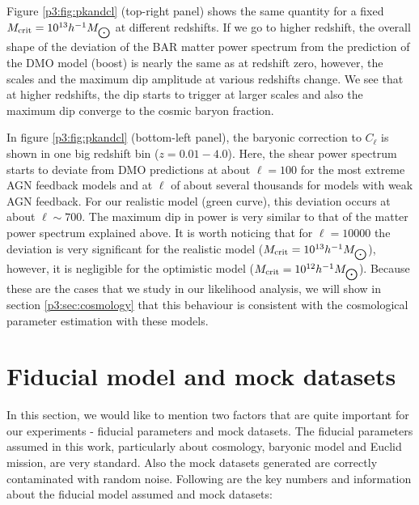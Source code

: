 \documentclass[
  11pt,
  twoside,
  openright,
  titlepage,
  headings=optiontoheadandtoc
]{scrbook}
\begin{document}
Figure \ref{p3:fig:pkandcl} (top-right panel) shows the same quantity for a fixed $M_{\rm crit} = 10^{13} h^{-1} M_{\bigodot}$ at different redshifts. If we go to higher redshift, the overall shape of the deviation of the BAR matter power spectrum from the prediction of the DMO model (boost) is nearly the same as at redshift zero, however, the scales and the maximum dip amplitude at various redshifts change. We see that at higher redshifts, the dip starts to trigger at larger scales and also the maximum dip converge to the cosmic baryon fraction.

In figure \ref{p3:fig:pkandcl} (bottom-left panel), the baryonic correction to $C_{\ell}$ is shown in one big redshift bin ($z=0.01-4.0$). Here, the shear power spectrum starts to deviate from DMO predictions at about $\ell =100$ for the most extreme AGN feedback models and at $\ell$ of about several thousands for models with weak AGN feedback. For our realistic model (green curve), this deviation occurs at about $\ell \sim 700$. The maximum dip in power is very similar to that of the matter power spectrum explained above. It is worth noticing that for $\ell=10000$ the deviation is very significant for the realistic model ($M_{\rm crit} = 10^{13} h^{-1} M_{\bigodot}$), however, it is negligible for the optimistic model ($M_{\rm crit} = 10^{12} h^{-1} M_{\bigodot}$). Because these are the cases that we study in our likelihood analysis, we will show in section \ref{p3:sec:cosmology} that this behaviour is consistent with the cosmological parameter estimation with these models.





\section{Fiducial model and mock datasets}
\label{p3:sec:fiducial}

In this section, we would like to mention two factors that are quite important for our experiments - fiducial parameters and mock datasets.  The fiducial parameters assumed in this work, particularly about cosmology, baryonic model and Euclid mission, are very standard. Also the mock datasets generated are correctly contaminated with random noise. Following are the key numbers and information about the fiducial model assumed and mock datasets:
\end{document}
